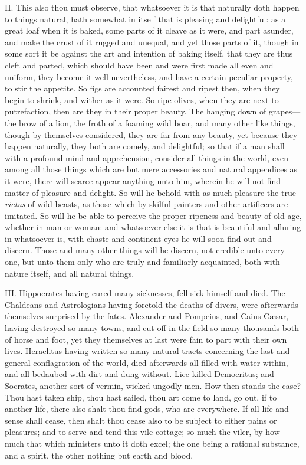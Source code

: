 II. This also thou must observe, that whatsoever it is that naturally
doth happen to things natural, hath somewhat in itself that is pleasing
and delightful: as a great loaf when it is baked, some parts of it cleave
as it were, and part asunder, and make the crust of it rugged and unequal,
and yet those parts of it, though in some sort it be against the art and
intention of baking itself, that they are thus cleft and parted, which
should have been and were first made all even and uniform, they become it
well nevertheless, and have a certain peculiar property, to stir the
appetite. So figs are accounted fairest and ripest then, when they begin
to shrink, and wither as it were. So ripe olives, when they are next to
putrefaction, then are they in their proper beauty. The hanging down of
grapes—the brow of a lion, the froth of a foaming wild boar, and
many other like things, though by themselves considered, they are far from
any beauty, yet because they happen naturally, they both are comely, and
delightful; so that if a man shall with a profound mind and apprehension,
consider all things in the world, even among all those things which are
but mere accessories and natural appendices as it were, there will scarce
appear anything unto him, wherein he will not find matter of pleasure and
delight. So will he behold with as much pleasure the true \emph{rictus} of wild
beasts, as those which by skilful painters and other artificers are
imitated. So will he be able to perceive the proper ripeness and beauty of
old age, whether in man or woman: and whatsoever else it is that is
beautiful and alluring in whatsoever is, with chaste and continent eyes he
will soon find out and discern. Those and many other things will he
discern, not credible unto every one, but unto them only who are truly and
familiarly acquainted, both with nature itself, and all natural things.

III. Hippocrates having cured many sicknesses, fell sick himself and
died. The Chaldeans and Astrologians having foretold the deaths of divers,
were afterwards themselves surprised by the fates. Alexander and Pompeius,
and Caius Cæsar, having destroyed so many towns, and cut off in the field
so many thousands both of horse and foot, yet they themselves at last were
fain to part with their own lives. Heraclitus having written so many
natural tracts concerning the last and general conflagration of the world,
died afterwards all filled with water within, and all bedaubed with dirt
and dung without. Lice killed Democritus; and Socrates, another sort of
vermin, wicked ungodly men. How then stands the case? Thou hast taken
ship, thou hast sailed, thou art come to land, go out, if to another life,
there also shalt thou find gods, who are everywhere. If all life and sense
shall cease, then shalt thou cease also to be subject to either pains or
pleasures; and to serve and tend this vile cottage; so much the viler, by
how much that which ministers unto it doth excel; the one being a rational
substance, and a spirit, the other nothing but earth and blood.

